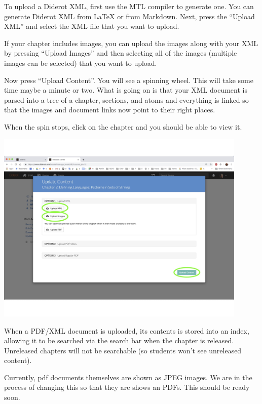 \begin{gram}
\label{guide:chapter::upload-xml}
To upload a Diderot XML, first use the MTL compiler to generate one.  You can generate Diderot XML from LaTeX or from Markdown.  Next, press the ``Upload XML'' and select the XML file that you want to upload. 
%

If your chapter includes images, you can upload the images along with your XML by pressing ``Upload Images'' and then selecting all of the images (multiple images can be selected) that you want to upload.

Now press ``Upload Content''. You will see a spinning wheel.  This will take some time maybe a minute or two.  What is going on is that your XML document is parsed into a tree of a chapter, sections, and atoms and everything is linked so that the images and document links now point to their right places.

When the spin stops, click on the chapter and you should be able to
view it.

\includegraphics[width=0.9\textwidth]{author/media/upload-xml.jpg}
\end{gram}



\begin{important}
When a PDF/XML document is uploaded, its contents is stored into an index, allowing it to be searched via the search bar when the chapter is released.
%
Unreleased chapters will not be searchable (so students won't see
unreleased content).
\end{important}

\begin{note}
Currently, pdf documents themselves are shown as JPEG images.  We are in the process of changing this so that they are shows an PDFs.  This should be ready soon.
\end{note}


